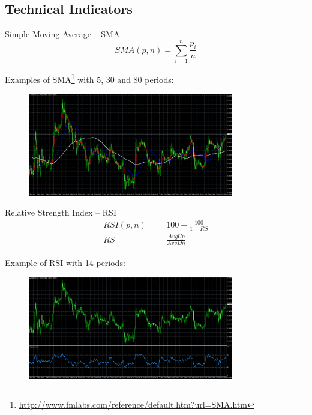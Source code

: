 \documentclass[12pt,portuguese]{beamer}
\begin{document}
\subsection{Technical Indicators}
\begin{frame}{Simple Moving Average -- SMA}
	$$SMA(p,n) = \sum_{i=1}^n \frac{p_i}{n}$$

	Examples of SMA\footnote{\url{http://www.fmlabs.com/reference/default.htm?url=SMA.htm}} with 5, 30 and 80 periods:
	\begin{figure}[H]
	\centering
	\includegraphics[width=0.8\textwidth]{images/mt4_SMA.png}
	\end{figure}
\end{frame}

\begin{frame}{Relative Strength Index -- RSI}
\begin{equation*}
\begin{array}{rcl}
RSI(p,n) & = & 100 - \frac{100}{1-RS}
\\
RS & = & \frac{AvgUp}{AvgDn}
\end{array}
\end{equation*}

	Example of RSI \citep{WilderJr1978} with 14 periods:
	\begin{figure}[H]
	\centering
	\includegraphics[width=0.8\textwidth]{images/mt4_RSI.png}
	\end{figure}
\end{frame}
\end{document}
